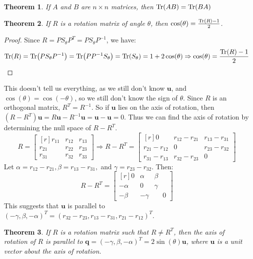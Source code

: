 \documentclass{article}
\theoremstyle{mystyle}
\newtheorem{theorem}{Theorem}[section]
\begin{document}
\begin{theorem}
If $A$ and $B$ are $n\times n$ matrices, then $\Tr(AB) = \Tr(BA)$
\end{theorem}
\begin{theorem}
If $R$ is a rotation matrix of angle $\theta$, then $\cos(\theta) = \frac{\Tr(R) - 1}{2}$.
\end{theorem}
\begin{proof}
Since $R = PS_{\theta} P^T = PS_{\theta}P^{-1}$, we have:
\begin{equation*}
    \Tr(R) = \Tr(PS_{\theta}P^{-1}) = \Tr(PP^{-1}S_{\theta}) = \Tr(S_{\theta}) = 1+2\cos(\theta)\Rightarrow \cos(\theta) = \frac{\Tr(R)-1}{2}
\end{equation*}
\end{proof}
This doesn't tell us everything, as we still don't know $\mathbf{u}$, and $\cos(\theta) = \cos(-\theta)$, so we still don't know the sign of $\theta$. Since $R$ is an orthogonal matrix, $R^T = R^{-1}$. So if $\mathbf{u}$ lies on the axis of rotation, then $(R-R^T)\mathbf{u} = R\mathbf{u}-R^{-1}\mathbf{u} = \mathbf{u}-\mathbf{u} = 0$. Thus we can find the axis of rotation by determining the null space of $R-R^T$. 
\begin{equation*}
    R = \begin{bmatrix*}[r] r_{11} & r_{12} & r_{13} \\ r_{21} & r_{22} & r_{23} \\ r_{31} & r_{32} & r_{33} \end{bmatrix*} \Rightarrow R-R^{T} = \begin{bmatrix*}[r] 0 & r_{12} - r_{21} & r_{13} - r_{31} \\ r_{21} - r_{12} & 0 & r_{23}-r_{32} \\ r_{31} - r_{13} & r_{32} - r_{23} & 0 \end{bmatrix*}
\end{equation*}
Let $\alpha = r_{12} - r_{21},\beta = r_{13} - r_{31},$ and $\gamma = r_{23}-r_{32}$. Then:
\begin{equation*}
    R-R^T = \begin{bmatrix*}[r] 0 & \alpha & \beta \\ -\alpha & 0 & \gamma \\ -\beta & -\gamma & \phantom{-}0 \end{bmatrix*}
\end{equation*}
This suggests that $\mathbf{u}$ is parallel to $(-\gamma, \beta, -\alpha)^{T} = (r_{32}-r_{23}, r_{13}-r_{31}, r_{21}-r_{12})^{T}$.
\begin{theorem}
If $R$ is a rotation matrix such that $R\ne R^T$, then the axis of rotation of $R$ is parallel to $\mathbf{q}=(-\gamma, \beta, -\alpha)^{T} = 2\sin(\theta)\mathbf{u}$, where $\mathbf{u}$ is a unit vector about the axis of rotation.
\end{theorem}
\end{document}
